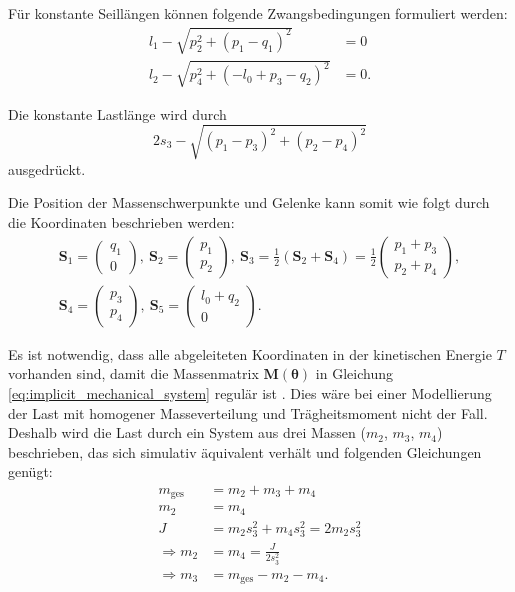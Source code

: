 Für konstante Seillängen können folgende Zwangsbedingungen formuliert werden:
\begin{align}
	l_{1} - \sqrt{p_{2}^{2} + \left(p_{1} - q_{1}\right)^{2}} &= 0\\
	l_{2} - \sqrt{p_{4}^{2} + \left(- l_{0} + p_{3} - q_{2}\right)^{2}} &= 0.	
\end{align}

Die konstante Lastlänge wird durch
\begin{equation}
	2 s_{3} - \sqrt{\left(p_{1} - p_{3}\right)^{2} + \left(p_{2} - p_{4}\right)^{2}}
\end{equation}
ausgedrückt.

Die Position der Massenschwerpunkte und Gelenke kann somit wie folgt durch die Koordinaten beschrieben werden:
\begin{align}
	\mathbf{S}_1 =
	\begin{pmatrix}
		q_1 \\
		0
	\end{pmatrix}, 
	\
	\mathbf{S}_2 =
	\begin{pmatrix}
		p_1 \\
		p_2
	\end{pmatrix},
	\
	\mathbf{S}_3 =
	\frac{1}{2}(\mathbf{S}_2 + \mathbf{S}_4) =
	\frac{1}{2}
	\begin{pmatrix}
		p_1 + p_3 \\
		p_2 + p_4
	\end{pmatrix},
	\nonumber \\
	\mathbf{S}_4 =
	\left(\begin{matrix}
		p_3 \\
		p_4
	\end{matrix}\right),
	\
	\mathbf{S}_5 =
	\left(\begin{matrix}
		l_0 + q_2 \\
		0
	\end{matrix}\right).
\end{align}

Es ist notwendig, dass alle abgeleiteten Koordinaten in der kinetischen Energie $T$ vorhanden sind, damit die Massenmatrix $\mathbf{M}(\boldsymbol{\theta})$ in Gleichung \eqref{eq:implicit_mechanical_system} regulär ist \cite[S. 7]{DissKnoll}. Dies wäre bei einer Modellierung der Last mit homogener Masseverteilung und Trägheitsmoment nicht der Fall. Deshalb wird die Last durch ein System aus drei Massen ($m_2$, $m_3$, $m_4$) beschrieben, das sich simulativ äquivalent verhält und folgenden Gleichungen genügt:
\begin{align}
	m_{\mathrm{ges}} &= m_2 + m_3 + m_4\\
	m_2 &= m_4\\
	J &= m_2 s_3^2 + m_4 s_3^2 = 2 m_2 s_3^2\\
	\Rightarrow m_2 &= m_4 = \frac{J}{2 s_3^2} \\
	\Rightarrow m_3 &= m_{\mathrm{ges}} - m_2 -m_4.
\end{align}

